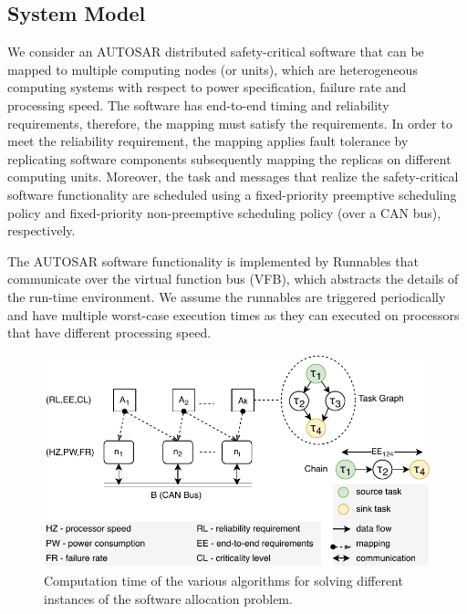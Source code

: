 \subsection*{System Model}
We consider an AUTOSAR distributed safety-critical software that can be mapped to multiple computing nodes (or units), which are heterogeneous computing systems with respect to power specification, failure rate and processing speed. The software has end-to-end timing and reliability requirements, therefore, the mapping must satisfy the requirements. In order to meet the reliability requirement, the mapping applies fault tolerance by replicating software components subsequently mapping the replicas on different computing units. Moreover, the task and messages that realize the safety-critical software functionality are scheduled using a fixed-priority preemptive scheduling policy and fixed-priority non-preemptive scheduling policy (over a  CAN bus), respectively.

The AUTOSAR software functionality is implemented by Runnables that communicate over the virtual function bus (VFB), which abstracts the details of the run-time environment. We assume the runnables are triggered periodically and have multiple worst-case execution times as they can executed on processors that have different processing speed.
\begin{figure}[h]
	\centering
	\includegraphics[width=0.8\linewidth]{images/system_model.pdf}
	\caption{Computation time of the various algorithms for solving different instances of the software allocation problem.}
	\label{fig_allocationtime_ilp_metaheuristic}\vspace{-0.4cm}
\end{figure}

